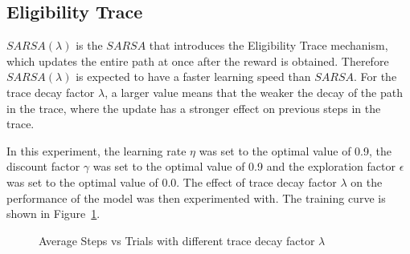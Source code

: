 \documentclass[conference]{IEEEtran}
\begin{document}
\subsection{Eligibility Trace}

\(SARSA(\lambda)\) is the \(SARSA\) that introduces the Eligibility Trace mechanism, which updates the entire path at once after the reward is obtained. Therefore \(SARSA(\lambda)\) is expected to have a faster learning speed than \(SARSA\). For the trace decay factor \({\lambda}\), a larger value means that the weaker the decay of the path in the trace, where the update has a stronger effect on previous steps in the trace.

In this experiment, the learning rate \({\eta}\) was set to the optimal value of 0.9, the discount factor \({\gamma}\) was set to the optimal value of 0.9 and the exploration factor \({\epsilon}\) was set to the optimal value of 0.0. The effect of trace decay factor \({\lambda}\) on the performance of the model was then experimented with. The training curve is shown in Figure~\ref{fig:trace}.

\begin{figure}[!ht]
    \centering
    \caption{Average Steps vs Trials with different trace decay factor \({\lambda}\)}\label{fig:trace}
\end{figure}
\end{document}
